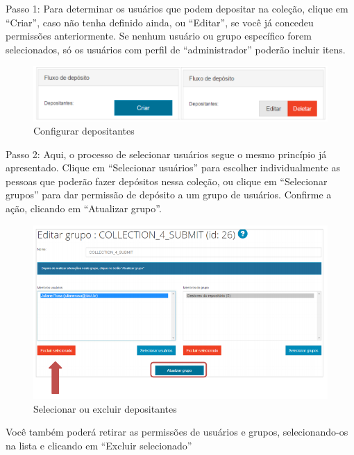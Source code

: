 \documentclass[12pt,hidelinks]{article}
\begin{document}
    Passo 1: Para determinar os usuários que podem depositar na coleção, clique em “Criar”, caso não tenha definido ainda, ou “Editar”, se você já concedeu permissões anteriormente. Se nenhum usuário ou grupo específico forem selecionados, só os usuários com perfil de “administrador” poderão incluir itens.
    
    \begin{figure}[!htp]
                \centering
                \includegraphics[scale=0.7]{figura/Figura42.png}
                \caption{Configurar depositantes}
            \label{Rotulo}
        \end{figure}

    \singlespacing
    
    Passo 2: Aqui, o processo de selecionar usuários segue o mesmo princípio já apresentado. Clique em “Selecionar usuários” para escolher individualmente as pessoas que poderão fazer depósitos nessa coleção, ou clique em “Selecionar grupos” para dar permissão de depósito a um grupo de usuários. Confirme a ação, clicando em “Atualizar grupo”.
    
    \begin{figure}[!htp]
                \centering
                \includegraphics[scale=0.8]{figura/Figura43.png}
                \caption{Selecionar ou excluir depositantes}
            \label{Rotulo}
        \end{figure}

\newpage

    Você também poderá retirar as permissões de usuários e grupos, selecionando-os na lista e clicando em “Excluir selecionado”
    
\end{document}
